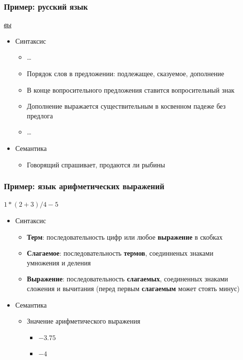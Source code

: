 \documentclass{beamer}
\begin{document}
\begin{frame}[fragile]
  \transwipe[direction=90]
  \frametitle{Пример: русский язык}

\begin{center}
    \textit{\uline{вы}  }
\end{center}

  \begin{itemize}
    \item Синтаксис
    \begin{itemize}
      \item \dots
      \item Порядок слов в предложении: подлежащее, сказуемое, дополнение
      \item В конце вопросительного предложения ставится вопросительный знак
      \item Дополнение выражается существительным в косвенном падеже без предлога
      \item \dots
    \end{itemize}
    \item Семантика
    \begin{itemize}
      \item Говорящий спрашивает, продаются ли рыбины
    \end{itemize}
  \end{itemize}
\end{frame}

\begin{frame}[fragile]
  \transwipe[direction=90]
  \frametitle{Пример: язык арифметических выражений}

 \begin{center}
    $1 * (2 + 3) / 4 - 5$
 \end{center}

  \begin{itemize}
    \item Синтаксис
    \begin{itemize}
      \item \textbf{Терм}: последовательность цифр или любое \textbf{выражение} в скобках
      \item \textbf{Слагаемое}: последовательность \textbf{термов}, соединненых знаками умножения и деления
      \item \textbf{Выражение}: последовательность \textbf{слагаемых}, соединенных знаками сложения и вычитания (перед первым \textbf{слагаемым} может стоять минус)
    \end{itemize}
    \item Семантика
    \begin{itemize}
      \item Значение арифметического выражения
      \pause
      \begin{itemize}
        \item $-3.75$
        \item $-4$
      \end{itemize}
    \end{itemize}
  \end{itemize}
\end{frame}
\end{document}
